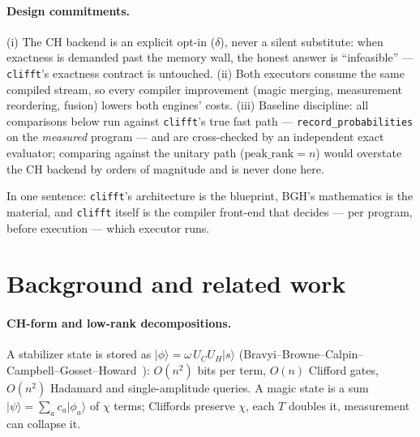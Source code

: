 \documentclass[11pt]{article}
\newcommand{\ket}[1]{\lvert #1 \rangle}
\begin{document}
\paragraph{Design commitments.} (i) The CH backend is an explicit opt-in
($\delta$), never a silent substitute: when exactness is demanded past the
memory wall, the honest answer is ``infeasible'' --- \texttt{clifft}'s
exactness contract is untouched. (ii) Both executors consume the same
compiled stream, so every compiler improvement (magic merging, measurement
reordering, fusion) lowers both engines' costs. (iii) Baseline discipline:
all comparisons below run against \texttt{clifft}'s true fast path ---
\texttt{record\_probabilities} on the \emph{measured} program --- and are
cross-checked by an independent exact evaluator; comparing against the
unitary path ($\mathrm{peak\_rank}=n$) would overstate the CH backend by orders
of magnitude and is never done here.

In one sentence: \texttt{clifft}'s architecture is the blueprint, BGH's
mathematics is the material, and \texttt{clifft} itself is the compiler
front-end that decides --- per program, before execution --- which executor
runs.

\section{Background and related work}
\paragraph{CH-form and low-rank decompositions.}
A stabilizer state is stored as $\ket{\phi}=\omega\,U_C U_H \ket{s}$
(Bravyi--Browne--Calpin--Campbell--Gosset--Howard~\cite{bravyi2019}): $O(n^2)$
bits per term, $O(n)$ Clifford gates, $O(n^2)$ Hadamard and single-amplitude
queries. A magic state is a sum $\ket\psi=\sum_a c_a\ket{\phi_a}$ of $\chi$
terms; Cliffords preserve $\chi$, each $T$ doubles it, measurement can
collapse it.
\end{document}
